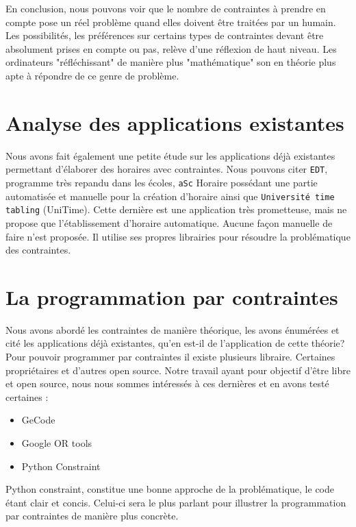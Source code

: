 En conclusion, nous pouvons voir que le nombre de contraintes à prendre en compte pose un réel problème quand elles doivent être traitées par un humain. Les possibilités, les préférences sur certains types de contraintes devant être absolument prises en compte ou pas, relève d'une réflexion de haut niveau. Les ordinateurs "réfléchissant" de manière plus "mathématique" son en théorie plus apte à répondre de ce genre de problème.

\section{Analyse des applications existantes}
Nous avons fait également une petite étude sur les applications déjà existantes permettant d'élaborer des horaires avec contraintes. Nous pouvons citer \texttt{EDT}, programme très repandu dans les écoles, \texttt{aSc} Horaire possédant une partie automatisée et manuelle pour la création d'horaire ainsi que \texttt{Université time tabling} (UniTime). Cette dernière est une application très prometteuse, mais ne propose que l'établissement d'horaire automatique. Aucune façon manuelle de faire n'est proposée. Il utilise ses propres librairies pour résoudre la problématique des contraintes.

\section{La programmation par contraintes}
Nous avons abordé les contraintes de manière théorique, les avons énumérées et cité les applications déjà existantes, qu'en est-il de l'application de cette théorie? Pour pouvoir programmer par contraintes il existe plusieurs libraire. Certaines propriétaires et d'autres open source. Notre travail ayant pour objectif d'être libre et open source, nous nous sommes intéressés à ces dernières et en avons testé certaines :\\
\begin{itemize}
\item GeCode
\item Google OR tools
\item Python Constraint
\end{itemize}
\bigskip

Python constraint, constitue une bonne approche de la problématique, le code étant clair et concis. Celui-ci sera le plus parlant pour illustrer la programmation par contraintes de manière plus concrète.

